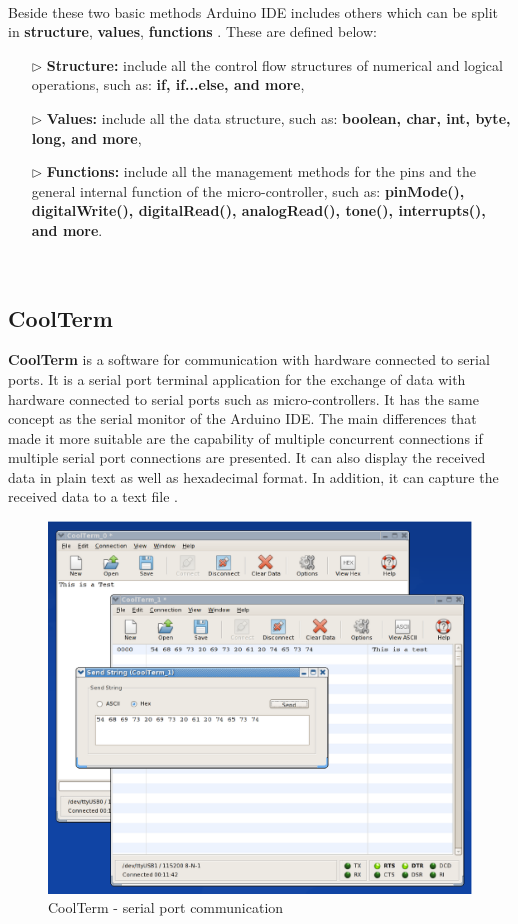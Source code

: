 \documentclass[12pt,a4paper,draft]{report}
\begin{document}
\ \\
Beside these two basic methods Arduino IDE includes others which can be split in \textbf{structure}, \textbf{values}, \textbf{functions} \cite{website:arduinosoftware}. These are defined below: 
\begin{itemize}
    \item[$\triangleright$] \textbf{Structure:} include all the control flow structures of numerical and logical operations, such as: \textbf{if, if...else, and more}, 
    \item[$\triangleright$] \textbf{Values:} include all the data structure, such as: \textbf{boolean, char, int, byte, long, and more},
    \item[$\triangleright$] \textbf{Functions:} include all the management methods for the pins and the general internal function of the micro-controller, such as: \textbf{pinMode(), digitalWrite(), digitalRead(), analogRead(), tone(), interrupts(), and more}.
\end{itemize}
\ \\
%
\subsection{CoolTerm}
\textbf{CoolTerm} is a software for communication with hardware connected to serial ports. It is a serial port terminal application for the exchange of data with hardware connected to serial ports  such as micro-controllers. It has the same concept as the serial monitor of the Arduino IDE. The main differences that made it more suitable are the capability of multiple concurrent connections if multiple serial port connections are presented. It can also display the received data in plain text as well as hexadecimal format. In addition, it can capture the received data to a text file \cite{website:coolterm}.
\begin{figure}[H]
\centering
    \includegraphics*[scale=0.3]{cooltermtinux}
    \caption{CoolTerm - serial port communication}
\end{figure}
\ \\
%
\end{document}
